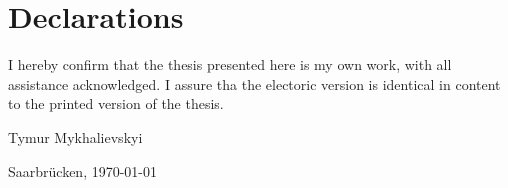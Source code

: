 ﻿\section*{Declarations}
I hereby confirm that the thesis presented here is my own work, with all assistance acknowledged. I assure tha the electoric version is identical in content to the printed version of the thesis.

\vspace{2cm}


Tymur Mykhalievskyi

Saarbrücken, \today